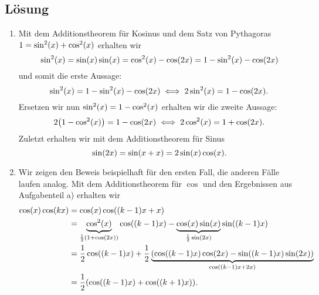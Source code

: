 \documentclass{exercise}
\begin{document}
    \subsection*{Lösung}
    \begin{enumerate}
        \item Mit dem Additionstheorem für Kosinus und dem Satz von Pythagoras \(1 = \sin^2\parentheses*{x} + \cos^2\parentheses*{x}\) erhalten wir
        \[
            \sin^2\parentheses*{x} = \sin\parentheses*{x}\sin\parentheses*{x} = \cos^2\parentheses*{x} - \cos\parentheses*{2x} = 1 - \sin^2\parentheses*{x} - \cos\parentheses*{2x}
        \] 
        und somit die erste Aussage:
        \[
            \sin^2\parentheses*{x} = 1 - \sin^2\parentheses*{x} - \cos\parentheses*{2x} \iff 2\sin^2\parentheses*{x} = 1 - \cos\parentheses*{2x}.
        \]
        Ersetzen wir nun \(\sin^2\parentheses*{x} = 1 - \cos^2\parentheses*{x}\) erhalten wir die zweite Aussage:
        \[
            2\parentheses*{1 - \cos^2\parentheses*{x}} = 1 - \cos\parentheses*{2x} \iff 2\cos^2\parentheses*{x} = 1 + \cos\parentheses*{2x}.
        \]
        Zuletzt erhalten wir mit dem Additionstheorem für Sinus
        \[
            \sin\parentheses*{2x} = \sin\parentheses*{x + x} = 2\sin\parentheses*{x}\cos\parentheses*{x}.
        \]
        \item Wir zeigen den Beweis beispielhaft für den ersten Fall, die anderen Fälle laufen analog.
        Mit dem Additionstheorem für \(\cos\) und den Ergebnissen aus Aufgabenteil a) erhalten wir
        \begin{align*}
            \cos\parentheses*{x}\cos\parentheses*{kx} &= \cos\parentheses*{x}\cos\parentheses*{\parentheses*{k - 1}x + x}\\
            &= \underbrace{\cos^2\parentheses*{x}}_{\frac{1}{2}\parentheses*{1 + \cos\parentheses*{2x}}}\cos\parentheses*{\parentheses*{k - 1}x} - \underbrace{\cos\parentheses*{x}\sin\parentheses*{x}}_{\frac{1}{2}\sin\parentheses*{2x}}\sin\parentheses*{\parentheses*{k - 1}x}\\
            &= \frac{1}{2}\cos\parentheses*{\parentheses*{k - 1}x} + \frac{1}{2}\underbrace{\parentheses*{\cos\parentheses*{\parentheses*{k - 1}x}\cos\parentheses*{2x} - \sin\parentheses*{\parentheses*{k - 1}x}\sin\parentheses*{2x}}}_{\cos\parentheses*{\parentheses*{k - 1}x + 2x}}\\
            &= \frac{1}{2}\parentheses*{\cos\parentheses*{\parentheses*{k - 1}x} + \cos\parentheses*{\parentheses*{k + 1}x}}.
        \end{align*}

\end{enumerate}
\end{document}
